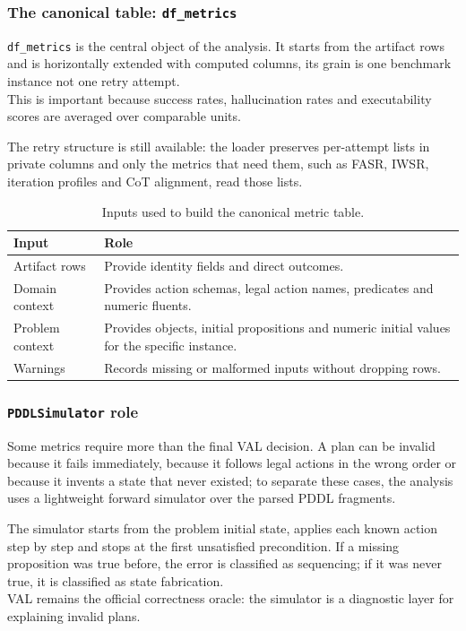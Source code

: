 \subsubsection{The canonical table: \texorpdfstring{\texttt{df\_metrics}}{df\_metrics}}

\texttt{df\_metrics} is the central object of the analysis. It starts from the artifact rows and is horizontally extended with computed columns, its grain is one benchmark instance not one retry attempt.\\
This is important because success rates, hallucination rates and executability scores are averaged over comparable units.

The retry structure is still available: the loader preserves per-attempt lists in private columns and only the metrics that need them, such as FASR, IWSR, iteration profiles and CoT alignment, read those lists.

\begin{table}[H]\small
\centering
\begin{tabularx}{\linewidth}{@{}l Y@{}}
\toprule
\textbf{Input} & \textbf{Role}\\
\midrule
Artifact rows & Provide identity fields and direct outcomes.\\
\addlinespace
Domain context & Provides action schemas, legal action names, predicates and numeric fluents.\\
\addlinespace
Problem context & Provides objects, initial propositions and numeric initial values for the specific instance.\\
\addlinespace
Warnings & Records missing or malformed inputs without dropping rows.\\
\bottomrule
\end{tabularx}
\caption{Inputs used to build the canonical metric table.}
\label{tab:dfmetrics-inputs-compact}
\end{table}

\subsubsection{\texorpdfstring{\texttt{PDDLSimulator}}{PDDLSimulator} role}

Some metrics require more than the final VAL decision. A plan can be invalid because it fails immediately, because it follows legal actions in the wrong order or because it invents a state that never existed; to separate these cases, the analysis uses a lightweight forward simulator over the parsed PDDL fragments.

The simulator starts from the problem initial state, applies each known action step by step and stops at the first unsatisfied precondition. If a missing proposition was true before, the error is classified as sequencing; if it was never true, it is classified as state fabrication.\\
VAL remains the official correctness oracle: the simulator is a diagnostic layer for explaining invalid plans.